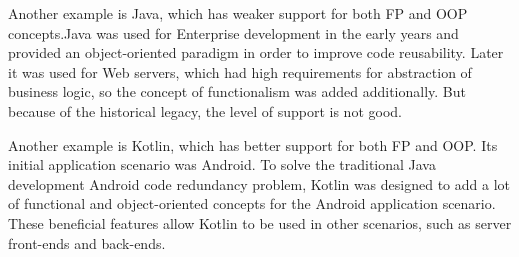 Another example is Java, which has weaker support for both FP and OOP concepts.Java was used for Enterprise development in the early years and provided an object-oriented paradigm in order to improve code reusability. Later it was used for Web servers, which had high requirements for abstraction of business logic, so the concept of functionalism was added additionally. But because of the historical legacy, the level of support is not good.

Another example is Kotlin, which has better support for both FP and OOP. Its initial application scenario was Android. To solve the traditional Java development Android code redundancy problem, Kotlin was designed to add a lot of functional and object-oriented concepts for the Android application scenario. These beneficial features allow Kotlin to be used in other scenarios, such as server front-ends and back-ends.


